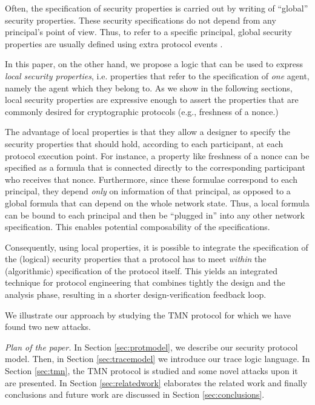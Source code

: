 \documentclass{entcs} \usepackage{entcsmacro}
\begin{document}
Often, the specification of security properties is carried out by
writing of ``global'' security properties. These security
specifications do not depend from any principal's point of view. Thus,
to refer to a specific principal, global security properties are
usually defined using extra protocol events \cite{Lowe97,Mea96}.

In this paper, on the other hand, we propose a logic that can be used
to express \emph{local security properties}, i.e. properties that
refer to the specification of \emph{one} agent, namely the agent which
they belong to. As we show in the following sections, local security
properties are expressive enough to assert the properties that are
commonly desired for cryptographic protocols (e.g., freshness of a
nonce.)

The advantage of local properties is that they allow a designer to
 specify the security properties that should hold,
according to each participant, at each protocol execution point.  For
instance, a property like freshness of a nonce can be specified as a
formula that is connected directly to the corresponding participant who
receives that nonce. Furthermore, since these formulae correspond to
each principal, they depend \emph{only} on information of that
principal, as opposed to a global formula that can depend on the whole
network state. Thus, a local formula can be bound to each principal
and then be ``plugged in'' into any other network specification. This
enables potential composability of the specifications.

Consequently, using local properties, it is possible to
integrate the specification of the (logical) security properties that
a protocol has to meet \emph{within} the (algorithmic) specification of
the protocol itself. This yields an integrated technique for protocol
engineering that combines tightly the design and the analysis phase,
resulting in a shorter design-verification feedback loop.

We illustrate our approach by studying the TMN protocol \cite{tmn90} for
which we have found two new attacks.

\emph{Plan of the paper.} In Section \ref{sec:protmodel}, we describe
our security protocol model. Then, in Section \ref{sec:tracemodel} we
introduce our trace logic language.  In Section \ref{sec:tmn}, the
TMN protocol is studied and some novel attacks upon it are
presented. In Section \ref{sec:relatedwork} elaborates the related
work and finally conclusions and future work are discussed in Section
\ref{sec:conclusions}.
\end{document}
